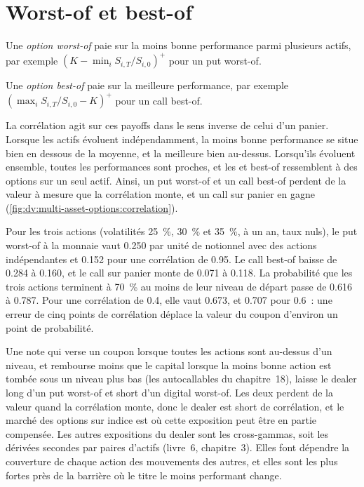 \section{Worst-of et best-of}

\begin{definition}\label{def:dv:multi-asset-options:worstof}
Une \emph{option worst-of} paie sur la moins bonne performance parmi plusieurs actifs, par exemple
$(K-\min_iS_{i,T}/S_{i,0})^+$ pour un put worst-of.
\end{definition}

\begin{definition}\label{def:dv:multi-asset-options:bestof}
Une \emph{option best-of} paie sur la meilleure performance, par exemple
$(\max_iS_{i,T}/S_{i,0}-K)^+$ pour un call best-of.
\end{definition}

La corrélation agit sur ces payoffs dans le sens inverse de celui d'un panier. Lorsque les actifs évoluent indépendamment, la
moins bonne performance se situe bien en dessous de la moyenne, et la meilleure bien au-dessus. Lorsqu'ils évoluent ensemble, toutes les performances sont
proches, et les  et best-of ressemblent à des options sur un seul actif. Ainsi, un put worst-of et un call best-of perdent
de la valeur à mesure que la corrélation monte, et un call sur panier en gagne
(\cref{fig:dv:multi-asset-options:correlation}).

\begin{example}\label{ex:dv:multi-asset-options:three}
Pour les trois actions (volatilités 25~\%, 30~\% et 35~\%, à un an, taux nuls), le put worst-of à la monnaie vaut
0.250 par unité de notionnel avec des actions indépendantes et 0.152 pour une corrélation de 0.95. Le call best-of baisse de 0.284 à
0.160, et le call sur panier monte de 0.071 à 0.118. La probabilité que les trois actions terminent à 70~\% au moins de leur niveau de départ
passe de 0.616 à 0.787. Pour une corrélation de 0.4, elle vaut 0.673, et 0.707 pour 0.6~: une erreur de cinq points
de corrélation déplace la valeur du coupon d'environ un point de probabilité.
\end{example}

Une note qui verse un coupon lorsque toutes les actions sont au-dessus d'un niveau, et rembourse moins que le capital lorsque la moins bonne
action est tombée sous un niveau plus bas (les autocallables du chapitre~18), laisse le dealer long d'un put worst-of et short
d'un digital worst-of. Les deux perdent de la valeur quand la corrélation monte, donc le dealer est short de corrélation, et le marché des options sur indice est
où cette exposition peut être en partie compensée. Les autres expositions du dealer sont les cross-gammas, soit les dérivées secondes par
paires d'actifs (livre~6, chapitre~3). Elles font dépendre la couverture de chaque action des mouvements des autres, et
elles sont les plus fortes près de la barrière où le titre le moins performant change.

